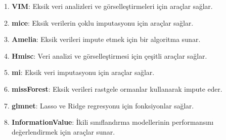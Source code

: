 \begin{enumerate}
    \item \textbf{VIM}: Eksik veri analizleri ve görselleştirmeleri için araçlar sağlar.
    \item \textbf{mice}: Eksik verilerin çoklu imputasyonu için araçlar sağlar.
    \item \textbf{Amelia}: Eksik verileri impute etmek için bir algoritma sunar.
    \item \textbf{Hmisc}: Veri analizi ve görselleştirmesi için çeşitli araçlar sağlar.
    \item \textbf{mi}: Eksik veri imputasyonu için araçlar sağlar.
    \item \textbf{missForest}: Eksik verileri rastgele ormanlar kullanarak impute eder.
    \item \textbf{glmnet}: Lasso ve Ridge regresyonu için fonksiyonlar sağlar.
    \item \textbf{InformationValue}: İkili sınıflandırma modellerinin performansını değerlendirmek için araçlar sunar.
\end{enumerate}

\newpage